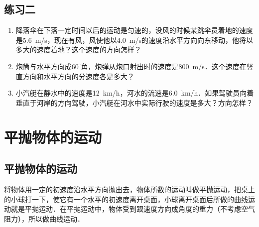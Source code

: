 \subsection*{练习二}
\begin{enumerate}
    \item 降落伞在下落一定时间以后的运动是匀速的，没风的时候某跳伞员着地的速度是\SI{5.6}{m/s}，现在有风，风使他以\SI{4.0}{m/s}的速度沿水平方向向东移动，他将以多大的速度着地？这个速度的方向怎样？
    \item 炮筒与水平方向成$60^\circ$角，炮弹从炮口射出时的速度是\SI{800}{m/s}．这个速度在竖直方向和水平方向的分速度各是多大？
    \item 小汽艇在静水中的速度是\SI{12}{km/h}，河水的流速是\SI{6.0}{km/h}．如果驾驶员向着垂直于河岸的方向驾驶，小汽艇在河水中实际行驶的速度是多大？方向怎样？
\end{enumerate}
\newpage
\section{平抛物体的运动}

\subsection{平抛物体的运动}

将物体用一定的初速度沿水平方向抛出去，物体所数的运动叫做平抛运动，把桌上的小球打一下，使它有一个水平的初速度离开桌面，小球离开桌面后所做的曲线运动就是平抛运动．在平抛运动中，物体受到跟速度方向成角度的重力（不考虑空气阻力），所以做曲线运动．

